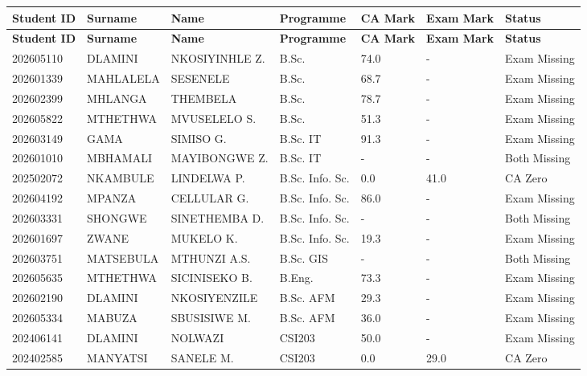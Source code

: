 \documentclass[12pt]{article}
\begin{document}
\begin{longtable}{@{}lllllll@{}}
\toprule
\textbf{Student ID} & \textbf{Surname} & \textbf{Name} & \textbf{Programme} & \textbf{CA Mark} & \textbf{Exam Mark} & \textbf{Status} \\
\midrule
\endfirsthead

\toprule
\textbf{Student ID} & \textbf{Surname} & \textbf{Name} & \textbf{Programme} & \textbf{CA Mark} & \textbf{Exam Mark} & \textbf{Status} \\
\midrule
\endhead

\bottomrule
\endfoot

202605110 & DLAMINI & NKOSIYINHLE Z. & B.Sc. & 74.0 & - & Exam Missing \\
202601339 & MAHLALELA & SESENELE & B.Sc. & 68.7 & - & Exam Missing \\
202602399 & MHLANGA & THEMBELA & B.Sc. & 78.7 & - & Exam Missing \\
202605822 & MTHETHWA & MVUSELELO S. & B.Sc. & 51.3 & - & Exam Missing \\

202603149 & GAMA & SIMISO G. & B.Sc. IT & 91.3 & - & Exam Missing \\
202601010 & MBHAMALI & MAYIBONGWE Z. & B.Sc. IT & - & - & Both Missing \\

202502072 & NKAMBULE & LINDELWA P. & B.Sc. Info. Sc. & 0.0 & 41.0 & CA Zero \\
202604192 & MPANZA & CELLULAR G. & B.Sc. Info. Sc. & 86.0 & - & Exam Missing \\
202603331 & SHONGWE & SINETHEMBA D. & B.Sc. Info. Sc. & - & - & Both Missing \\
202601697 & ZWANE & MUKELO K. & B.Sc. Info. Sc. & 19.3 & - & Exam Missing \\

202603751 & MATSEBULA & MTHUNZI A.S. & B.Sc. GIS & - & - & Both Missing \\

202605635 & MTHETHWA & SICINISEKO B. & B.Eng. & 73.3 & - & Exam Missing \\

202602190 & DLAMINI & NKOSIYENZILE & B.Sc. AFM & 29.3 & - & Exam Missing \\
202605334 & MABUZA & SBUSISIWE M. & B.Sc. AFM & 36.0 & - & Exam Missing \\

202406141 & DLAMINI & NOLWAZI & CSI203 & 50.0 & - & Exam Missing \\
202402585 & MANYATSI & SANELE M. & CSI203 & 0.0 & 29.0 & CA Zero \\

\end{longtable}
\end{document}
